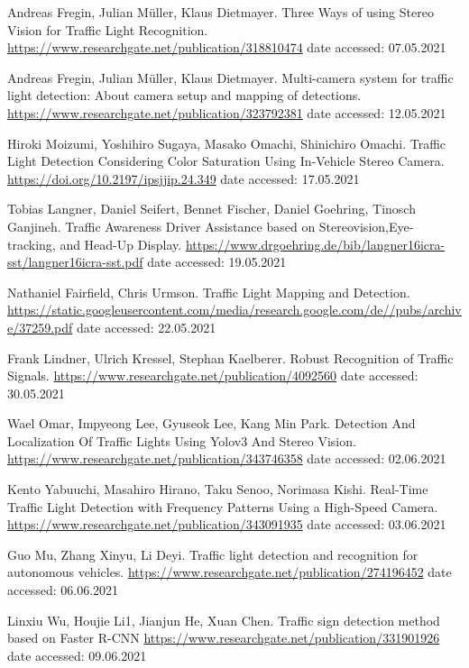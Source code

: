\documentclass[letterpaper, 10 pt, conference]{ieeeconf} %
\begin{document}
\begin{thebibliography}{99}

 Andreas Fregin, Julian M\"uller, Klaus Dietmayer. Three Ways of using Stereo Vision for Traffic Light Recognition. \url{https://www.researchgate.net/publication/318810474} date accessed: 07.05.2021

 Andreas Fregin, Julian M\"uller, Klaus Dietmayer. Multi-camera system for traffic light detection: About camera setup and mapping of detections. \url{https://www.researchgate.net/publication/323792381} date accessed: 12.05.2021

 Hiroki Moizumi, Yoshihiro Sugaya, Masako Omachi, Shinichiro Omachi. Traffic Light Detection Considering Color Saturation Using In-Vehicle Stereo Camera. \url{https://doi.org/10.2197/ipsjjip.24.349} date accessed: 17.05.2021

 Tobias Langner, Daniel Seifert, Bennet Fischer, Daniel Goehring, Tinosch Ganjineh. Traffic Awareness Driver Assistance based on Stereovision,Eye-tracking, and Head-Up Display. \url{https://www.drgoehring.de/bib/langner16icra-sst/langner16icra-sst.pdf} date accessed: 19.05.2021

Nathaniel Fairfield, Chris Urmson. Traffic Light Mapping and Detection. \url{https://static.googleusercontent.com/media/research.google.com/de//pubs/archive/37259.pdf} date accessed: 22.05.2021

Frank Lindner, Ulrich Kressel, Stephan Kaelberer. Robust Recognition of Traffic Signals. \url{https://www.researchgate.net/publication/4092560} date accessed: 30.05.2021

Wael Omar, Impyeong Lee, Gyuseok Lee, Kang Min Park. Detection And Localization Of Traffic Lights Using Yolov3 And Stereo Vision. \url{https://www.researchgate.net/publication/343746358} date accessed: 02.06.2021

Kento Yabuuchi, Masahiro Hirano, Taku Senoo, Norimasa Kishi. Real-Time Traffic Light Detection with Frequency Patterns Using a High-Speed Camera. \url{https://www.researchgate.net/publication/343091935} date accessed: 03.06.2021

Guo Mu, Zhang Xinyu, Li Deyi. Traffic light detection and recognition for autonomous vehicles. \url{https://www.researchgate.net/publication/274196452} date accessed: 06.06.2021

Linxiu Wu, Houjie Li1, Jianjun He, Xuan Chen. Traffic sign detection method based on Faster R-CNN \url{https://www.researchgate.net/publication/331901926} date accessed: 09.06.2021

\end{thebibliography}
\end{document}
